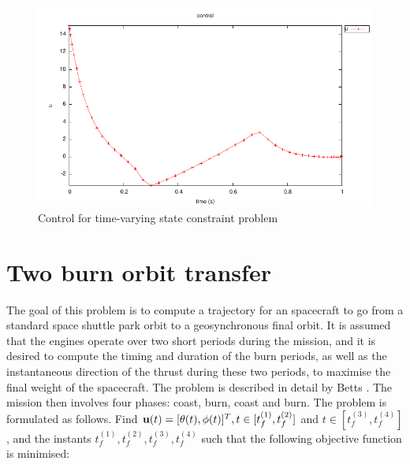 \documentclass[a4paper,11pt]{report}    %
\newcommand{\mt}[1]{\ensuremath \mathbf{#1}}
\begin{document}
\begin{figure}
  \centering
  \includegraphics{../examples/stc1/stc1_control}
  \caption{Control for time-varying state constraint problem}
 \label{fig:stc1_control}
\end{figure}



\section{Two burn orbit transfer}

\label{sec:ltot}

The goal of this problem is to compute a trajectory for an spacecraft to go
from a standard space shuttle park orbit to a geosynchronous final orbit. It is assumed that
the engines operate over two short periods during the mission, and it is desired to compute
the timing and duration of the burn periods, as well as the instantaneous direction
of the thrust during these two periods, to   maximise the final 
weight of the spacecraft. The problem is described in detail by Betts \cite{Betts:01}. The mission
then involves four phases: coast, burn, coast and burn. The problem
is formulated as follows. Find $\mt{u}(t) = [ \theta(t), \phi(t)]^T, t \in [t_f^{(1)}, t_f^{(2)}]$
and $t \in [t_f^{(3)}, t_f^{(4)}]$,  and the instants $t_f^{(1)}, t_f^{(2)}, t_f^{(3)}, t_f^{(4)}$  such that
the following objective function is minimised:
\end{document}
